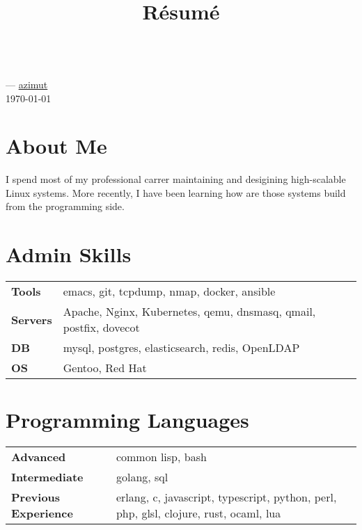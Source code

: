 \documentclass[11pt]{article}
\renewcommand{\maketitle}{
  \begin{center}{\huge\bfseries\theauthor} \\
    \vspace{.25em}
    {\faEnvelope} \href {mailto:\MAILTO} {\expandafter\randomize\expandafter{\MAILTO}}
    ---
    {\faGithub} \href {https://github.com/azimut} {azimut} \\
    \vspace{.25em}
    \today
  \end{center}
}
\begin{document}
\title{R\'esum\'e}
\author{\FULLNAME}

\maketitle


\section{About Me}

I spend most of my professional carrer maintaining and desigining high-scalable Linux systems. More recently, I have been learning how are those systems build from the programming side.


\section{Admin Skills}


\begin{tabular}{@{}lll@{}}
  \hspace{.1em} \textbf{Tools}   & emacs, git, tcpdump, nmap, docker, ansible \\
  \hspace{.1em} \textbf{Servers} & Apache, Nginx, Kubernetes, qemu, dnsmasq, qmail, postfix, dovecot \\
  \hspace{.1em} \textbf{DB}      & mysql, postgres, elasticsearch, redis, OpenLDAP \\
  \hspace{.1em} \textbf{OS}      & Gentoo, Red Hat \\
\end{tabular}


\section{Programming Languages}


\begin{tabular}{@{}lll@{}}
  \hspace{.1em} \textbf{Advanced} & common lisp, bash \\
  \hspace{.1em} \textbf{Intermediate} & golang, sql \\
  \hspace{.1em} \textbf{Previous Experience} & erlang, c, javascript, typescript, python, perl, php, glsl, clojure, rust, ocaml, lua \\
\end{tabular}
\end{document}
